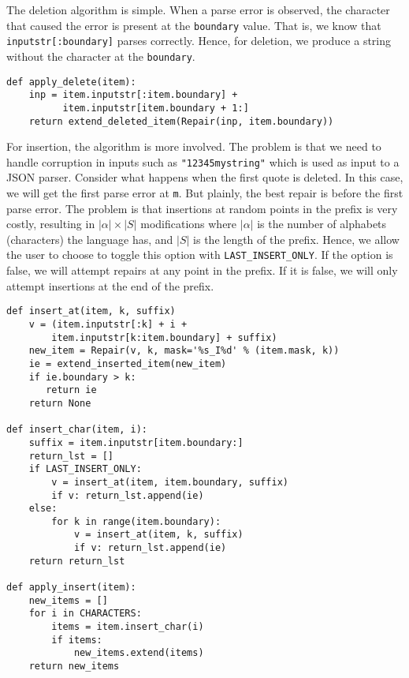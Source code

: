 \documentclass[sigconf,review,anonymous]{acmart}
\def\<#1>{\texttt{#1}}
\newcommand{\brepair}{\textit{BRepair}\xspace}
\begin{document}
The deletion algorithm is simple. When a parse error is observed,
the character that caused the error is present at the \<boundary> value.
That is, we know that \<inputstr[:boundary]> parses correctly. Hence, for
deletion, we produce a string without the character at the \<boundary>.
\begin{lstlisting}[caption=\brepair repairs,label={lst:repairsdelete}]
def apply_delete(item):
    inp = item.inputstr[:item.boundary] +
          item.inputstr[item.boundary + 1:]
    return extend_deleted_item(Repair(inp, item.boundary))
\end{lstlisting}

For insertion, the algorithm is more involved. The problem is that we need to
handle corruption in inputs such as \<"12345mystring"> which is used as input
to a JSON parser. Consider what happens when the first quote is deleted. In this
case, we will get the first parse error at \<m>. But plainly, the best repair
is before the first parse error. The problem is that insertions at random
points in the prefix is very costly, resulting in $|\alpha| \times |S|$
modifications where $|\alpha|$ is the number of alphabets (characters) the
language has, and $|S|$ is the length of the prefix.
Hence, we allow the user to choose to toggle this option with
\<LAST\_INSERT\_ONLY>. If the option is false, we will attempt repairs at any
point in the prefix. If it is false, we will only attempt insertions at the end
of the prefix.
\begin{lstlisting}[caption=\brepair repairs,label={lst:repairs}]
def insert_at(item, k, suffix)
    v = (item.inputstr[:k] + i +
        item.inputstr[k:item.boundary] + suffix)
    new_item = Repair(v, k, mask='%s_I%d' % (item.mask, k))
    ie = extend_inserted_item(new_item)
    if ie.boundary > k:
       return ie
    return None

def insert_char(item, i):
    suffix = item.inputstr[item.boundary:]
    return_lst = []
    if LAST_INSERT_ONLY:
        v = insert_at(item, item.boundary, suffix)
        if v: return_lst.append(ie)
    else:
        for k in range(item.boundary):
            v = insert_at(item, k, suffix)
            if v: return_lst.append(ie)
    return return_lst

def apply_insert(item):
    new_items = []
    for i in CHARACTERS:
        items = item.insert_char(i)
        if items:
            new_items.extend(items)
    return new_items
\end{lstlisting}
\end{document}
